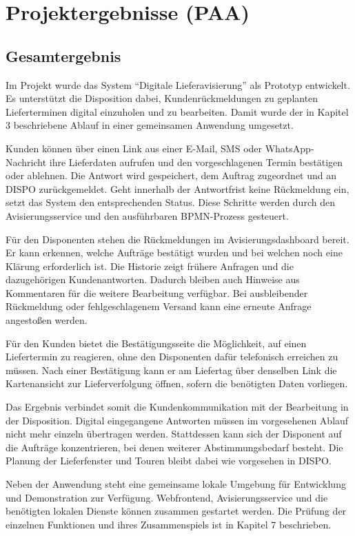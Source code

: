 \section{Projektergebnisse (PAA)}
\label{sec:projektergebnisse}

\subsection{Gesamtergebnis}

Im Projekt wurde das System \enquote{Digitale Lieferavisierung} als Prototyp entwickelt. Es
unterstützt die Disposition dabei, Kundenrückmeldungen zu geplanten Lieferterminen digital
einzuholen und zu bearbeiten. Damit wurde der in Kapitel 3 beschriebene Ablauf in einer
gemeinsamen Anwendung umgesetzt.

Kunden können über einen Link aus einer E-Mail, SMS oder WhatsApp-Nachricht ihre Lieferdaten
aufrufen und den vorgeschlagenen Termin bestätigen oder ablehnen. Die Antwort wird
gespeichert, dem Auftrag zugeordnet und an DISPO zurückgemeldet. Geht innerhalb der
Antwortfrist keine Rückmeldung ein, setzt das System den entsprechenden Status. Diese
Schritte werden durch den Avisierungsservice und den ausführbaren BPMN-Prozess gesteuert.

Für den Disponenten stehen die Rückmeldungen im Avisierungsdashboard bereit. Er kann
erkennen, welche Aufträge bestätigt wurden und bei welchen noch eine Klärung erforderlich
ist. Die Historie zeigt frühere Anfragen und die dazugehörigen Kundenantworten. Dadurch
bleiben auch Hinweise aus Kommentaren für die weitere Bearbeitung verfügbar. Bei
ausbleibender Rückmeldung oder fehlgeschlagenem Versand kann eine erneute Anfrage angestoßen
werden.

Für den Kunden bietet die Bestätigungsseite die Möglichkeit, auf einen Liefertermin zu
reagieren, ohne den Disponenten dafür telefonisch erreichen zu müssen. Nach einer
Bestätigung kann er am Liefertag über denselben Link die Kartenansicht zur Lieferverfolgung
öffnen, sofern die benötigten Daten vorliegen.

Das Ergebnis verbindet somit die Kundenkommunikation mit der Bearbeitung in der Disposition.
Digital eingegangene Antworten müssen im vorgesehenen Ablauf nicht mehr einzeln übertragen
werden. Stattdessen kann sich der Disponent auf die Aufträge konzentrieren, bei denen
weiterer Abstimmungsbedarf besteht. Die Planung der Lieferfenster und Touren bleibt dabei
wie vorgesehen in DISPO.

Neben der Anwendung steht eine gemeinsame lokale Umgebung für Entwicklung und Demonstration
zur Verfügung. Webfrontend, Avisierungsservice und die benötigten lokalen Dienste können
zusammen gestartet werden. Die Prüfung der einzelnen Funktionen und ihres Zusammenspiels ist
in Kapitel 7 beschrieben.

